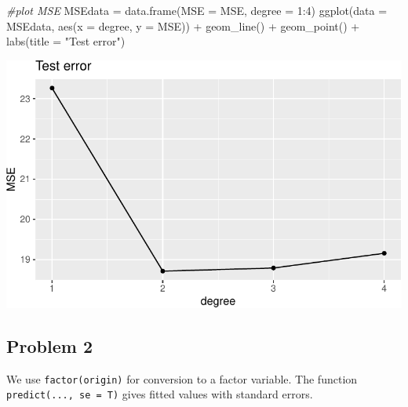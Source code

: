 \documentclass[
]{article}
\newenvironment{Shaded}{\begin{snugshade}}{\end{snugshade}}
\newcommand{\AttributeTok}[1]{\textcolor[rgb]{0.77,0.63,0.00}{#1}}
\newcommand{\CommentTok}[1]{\textcolor[rgb]{0.56,0.35,0.01}{\textit{#1}}}
\newcommand{\DecValTok}[1]{\textcolor[rgb]{0.00,0.00,0.81}{#1}}
\newcommand{\FunctionTok}[1]{\textcolor[rgb]{0.00,0.00,0.00}{#1}}
\newcommand{\NormalTok}[1]{#1}
\newcommand{\OtherTok}[1]{\textcolor[rgb]{0.56,0.35,0.01}{#1}}
\newcommand{\SpecialCharTok}[1]{\textcolor[rgb]{0.00,0.00,0.00}{#1}}
\newcommand{\StringTok}[1]{\textcolor[rgb]{0.31,0.60,0.02}{#1}}
\begin{document}
\begin{Shaded}
\begin{Highlighting}[]
\CommentTok{\#plot MSE}
\NormalTok{MSEdata }\OtherTok{=} \FunctionTok{data.frame}\NormalTok{(}\AttributeTok{MSE =}\NormalTok{ MSE, }\AttributeTok{degree =} \DecValTok{1}\SpecialCharTok{:}\DecValTok{4}\NormalTok{)}
\FunctionTok{ggplot}\NormalTok{(}\AttributeTok{data =}\NormalTok{ MSEdata, }\FunctionTok{aes}\NormalTok{(}\AttributeTok{x =}\NormalTok{ degree, }\AttributeTok{y =}\NormalTok{ MSE)) }\SpecialCharTok{+} \FunctionTok{geom\_line}\NormalTok{() }\SpecialCharTok{+} 
  \FunctionTok{geom\_point}\NormalTok{() }\SpecialCharTok{+} \FunctionTok{labs}\NormalTok{(}\AttributeTok{title =} \StringTok{"Test error"}\NormalTok{)}
\end{Highlighting}
\end{Shaded}

\includegraphics{RecEx7-sol_files/figure-latex/unnamed-chunk-2-3.pdf}

\hypertarget{problem-2}{%
\subsection{Problem 2}\label{problem-2}}

We use \texttt{factor(origin)} for conversion to a factor variable. The
function \texttt{predict(...,\ se\ =\ T)} gives fitted values with
standard errors.
\end{document}
